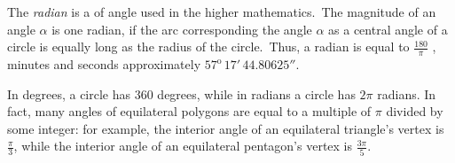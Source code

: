 \documentclass[12pt]{article}
\begin{document}
The {\em radian} is a  of angle used in the higher mathematics. \,The magnitude of an angle $\alpha$ is one radian, if the arc corresponding the angle $\alpha$ as a central angle of a circle is equally long as the radius of the circle. \,Thus, a radian is equal to $\frac{180}{\pi}$ , minutes and seconds approximately $57^{\mathrm{o}}\,17'\,44.80625''.$

In degrees, a circle has 360 degrees, while in radians a circle has $2\pi$ radians. In fact, many angles of equilateral polygons are equal to a multiple of $\pi$ divided by some integer: for example, the interior angle of an equilateral triangle's vertex is $\frac{\pi}{3}$, while the interior angle of an equilateral pentagon's vertex is $\frac{3\pi}{5}$.
\end{document}
